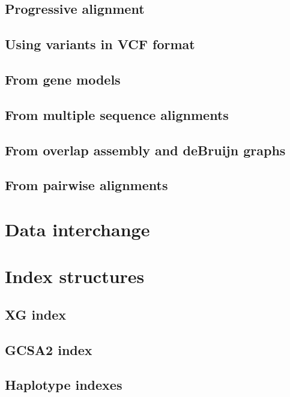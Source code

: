 \subsection{Progressive alignment}

\subsection{Using variants in VCF format}

\subsection{From gene models} %

\subsection{From multiple sequence alignments}

\subsection{From overlap assembly and deBruijn graphs}

\subsection{From pairwise alignments}

\section{Data interchange}


\section{Index structures}

\subsection{XG index}

\subsection{GCSA2 index}

\subsection{Haplotype indexes}

